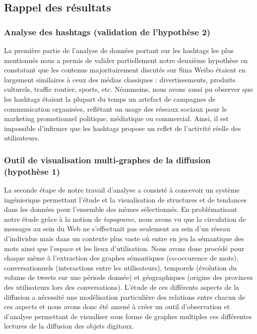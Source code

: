 \subsection{Rappel des r\'esultats} 
\subsubsection{Analyse des hashtags (validation de l{\textquoteright}hypoth\`ese 2)} 

La premi\`ere partie de l{\textquoteright}analyse de donn\'ees portant sur les hashtags les plus mentionn\'es nous a permis de valider partiellement notre deuxi\`eme hypoth\`ese en constatant que les contenus majoritairement discut\'es sur Sina Weibo \'etaient en largement similaires \`a ceux des m\'edias classiques : divertissements, produits culturels, traffic routier, sports, etc. N\'eanmoins, nous avons aussi pu observer que les hashtags \'etaient la plupart du temps un artefact de campagnes de communication organis\'ees, refl\'etant un usage des r\'eseaux sociaux pour le marketing promotionnel politique, m\'ediatique ou commercial. Ainsi, il est impossible d{\textquoteright}infirmer que les hashtags propose un reflet de l{\textquoteright}activit\'e r\'eelle des utilisateurs.

\subsubsection{Outil de visualisation multi-graphes de la diffusion (hypoth\`ese 1)} 

La seconde \'etape de notre travail d{\textquoteright}analyse a consist\'e \`a concevoir un syst\`eme ing\'enierique permettant l{\textquoteright}\'etude et la visualisation de structures et de tendances dans les donn\'ees pour l{\textquoteright}ensemble des m\`emes s\'electionn\'es. En probl\'ematisant notre \'etude gr\^ace \`a la notion de \textit{topograme,} nous avons vu que la circulation de messages au sein du Web ne s{\textquoteright}effectuait pas seulement au sein d{\textquoteright}un r\'eseau d{\textquoteright}individus mais dans un contexte plus vaste o\`u entre en jeu la s\'emantique des mots ainsi que l{\textquoteright}espace et les lieux d{\textquoteright}utilisation. Nous avons donc proc\'ed\'e pour chaque m\`eme \`a l{\textquoteright}extraction des graphes s\'emantiques (co-occurence de mots), conversationnels (interactions entre les utilisateurs), temporels (\'evolution du volume de tweets sur une p\'eriode donn\'ee) et g\'eographiques (origine des provinces des utilisateurs lors des conversations). L{\textquoteright}\'etude de ces diff\'erents aspects de la diffusion a n\'ecessit\'e une mod\'elisation particuli\`ere des relations entre chacun de ces aspects et nous avons donc \'et\'e amen\'e \`a cr\'eer un outil d{\textquoteright}observation et d{\textquoteright}analyse permettant de visualiser sous forme de graphes multiples ces diff\'erentes lectures de la diffusion des objets digitaux.  
  
